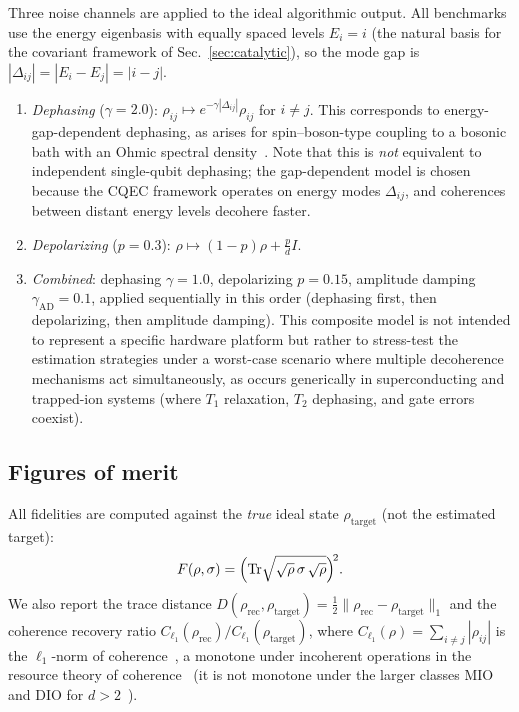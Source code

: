 \documentclass[12pt,a4paper]{article}
\newcommand{\tr}{\mathrm{Tr}}
\newcommand{\rhot}{\rho_\mathrm{target}}
\newcommand{\rhor}{\rho_\mathrm{rec}}
\begin{document}
Three noise channels are applied to the ideal algorithmic output.
All benchmarks use the energy eigenbasis with equally spaced levels $E_i = i$ (the natural basis for the covariant framework of Sec.~\ref{sec:catalytic}), so the mode gap is $|\Delta_{ij}| = |E_i - E_j| = |i - j|$.
\begin{enumerate}
\item \emph{Dephasing} ($\gamma = 2.0$): $\rho_{ij} \mapsto e^{-\gamma|\Delta_{ij}|}\rho_{ij}$ for $i \neq j$.
This corresponds to energy-gap-dependent dephasing, as arises for spin--boson-type coupling to a bosonic bath with an Ohmic spectral density~\cite{Leggett1987,BreuerPetruccione2002}.
Note that this is \emph{not} equivalent to independent single-qubit dephasing; the gap-dependent model is chosen because the CQEC framework operates on energy modes $\Delta_{ij}$, and coherences between distant energy levels decohere faster.
\item \emph{Depolarizing} ($p = 0.3$): $\rho \mapsto (1-p)\rho + \frac{p}{d}I$.
\item \emph{Combined}: dephasing $\gamma = 1.0$, depolarizing $p = 0.15$, amplitude damping $\gamma_\mathrm{AD} = 0.1$, applied sequentially in this order (dephasing first, then depolarizing, then amplitude damping).
This composite model is not intended to represent a specific hardware platform but rather to stress-test the estimation strategies under a worst-case scenario where multiple decoherence mechanisms act simultaneously, as occurs generically in superconducting and trapped-ion systems (where $T_1$ relaxation, $T_2$ dephasing, and gate errors coexist).
\end{enumerate}

\subsection{Figures of merit}
\label{sec:figures_merit}

All fidelities are computed against the \emph{true} ideal state $\rhot$ (not the estimated target):
\begin{equation}
F(\rho,\sigma) = \Bigl(\tr\sqrt{\sqrt{\rho}\,\sigma\,\sqrt{\rho}}\Bigr)^{\!2}.
\label{eq:fidelity}
\end{equation}
We also report the trace distance $D(\rhor, \rhot) = \frac{1}{2}\|\rhor - \rhot\|_1$ and the coherence recovery ratio $C_{\ell_1}(\rhor)/C_{\ell_1}(\rhot)$, where $C_{\ell_1}(\rho) = \sum_{i \neq j} |\rho_{ij}|$ is the $\ell_1$-norm of coherence~\cite{Baumgratz2014}, a monotone under incoherent operations in the resource theory of coherence~\cite{Streltsov2017} (it is not monotone under the larger classes MIO and DIO for $d > 2$~\cite{Streltsov2017}).
\end{document}
